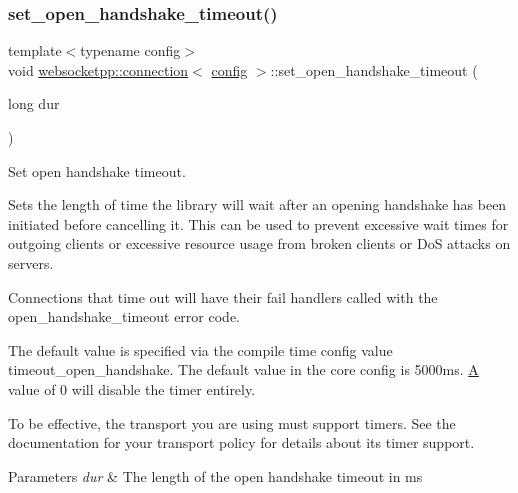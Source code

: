 \subsubsection{\texorpdfstring{set\+\_\+open\+\_\+handshake\+\_\+timeout()}{set\_open\_handshake\_timeout()}}
{\footnotesize\ttfamily template$<$typename config$>$ \\
void \mbox{\hyperlink{classwebsocketpp_1_1connection}{websocketpp\+::connection}}$<$ \mbox{\hyperlink{classconfig}{config}} $>$\+::set\+\_\+open\+\_\+handshake\+\_\+timeout (\begin{DoxyParamCaption}\item[{long}]{dur }\end{DoxyParamCaption})\hspace{0.3cm}{\ttfamily [inline]}}



Set open handshake timeout. 

Sets the length of time the library will wait after an opening handshake has been initiated before cancelling it. This can be used to prevent excessive wait times for outgoing clients or excessive resource usage from broken clients or DoS attacks on servers.

Connections that time out will have their fail handlers called with the open\+\_\+handshake\+\_\+timeout error code.

The default value is specified via the compile time config value \textquotesingle{}timeout\+\_\+open\+\_\+handshake\textquotesingle{}. The default value in the core config is 5000ms. \mbox{\hyperlink{struct_a}{A}} value of 0 will disable the timer entirely.

To be effective, the transport you are using must support timers. See the documentation for your transport policy for details about its timer support.


\begin{DoxyParams}{Parameters}
{\em dur} & The length of the open handshake timeout in ms \\
\hline
\end{DoxyParams}
\mbox{\label{classwebsocketpp_1_1connection_a6e21e63abbbba88f818742e9da25fa8b}} 
